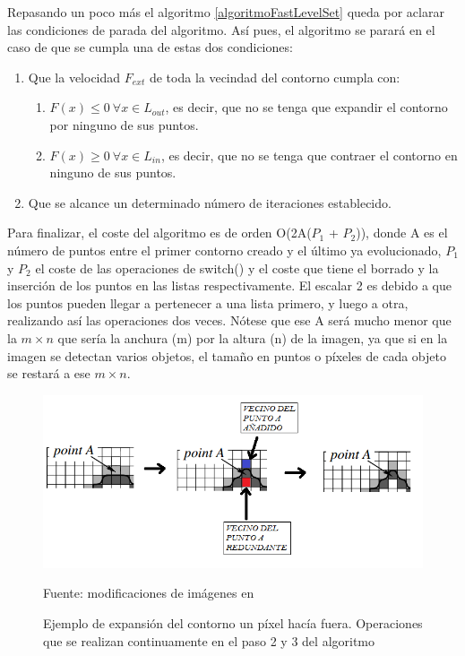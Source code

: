Repasando un poco m\'{a}s el algoritmo \ref{algoritmoFastLevelSet} queda por aclarar las condiciones de parada del algoritmo. As\'{i} pues, el algoritmo se parar\'{a} en el caso de que se cumpla una de estas dos condiciones:

\begin{enumerate}
	\item Que la velocidad $F_{ext}$ de toda la vecindad del contorno cumpla con:
	\begin{enumerate}	
		\item $F(x) \leq 0 \ \forall x \in L_{out}$, es decir, que no se tenga que expandir el contorno por ninguno de sus puntos.
		\item $F(x) \geq 0 \ \forall x \in L_{in}$, es decir, que no se tenga que contraer el contorno en ninguno de sus puntos.
	\end{enumerate}
	\item Que se alcance un determinado n\'{u}mero de iteraciones establecido.
\end{enumerate}
 
Para finalizar, el coste del algoritmo es de orden O(2A($P_1$ + $P_2$)), donde A es el n\'{u}mero de puntos entre el primer contorno creado y el \'{u}ltimo ya evolucionado, $P_1$ y $P_2$ el coste de las operaciones de switch() y el coste que tiene el borrado y la inserci\'{o}n de los puntos en las listas respectivamente. El escalar 2 es debido a que los puntos pueden llegar a pertenecer a una lista primero, y luego a otra, realizando as\'{i} las operaciones dos veces. N\'{o}tese que ese A ser\'{a} mucho menor que la $m \times n$ que ser\'{i}a la anchura (m) por la altura (n) de la imagen, ya que si en la imagen se detectan varios objetos, el tama\~{n}o en puntos o p\'{i}xeles de cada objeto se restar\'{a} a ese $m \times n$.
   
 \begin{figure}[]
 	\captionsetup{justification=centering}
 	\centering
 	\includegraphics[width=.8\textwidth]{./imagenes/switchLevelSet}
 	\caption{Ejemplo de expansi\'{o}n del contorno un p\'{i}xel hac\'{i}a fuera. Operaciones que se realizan continuamente en el paso 2 y 3 del algoritmo}
	\vspace{2 mm}		
 	Fuente: modificaciones de im\'{a}genes en \cite{yong1}	
 	\label{switchLevelSet}
 \end{figure}
 
